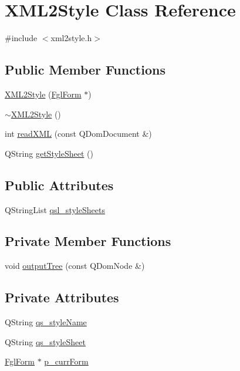 \hypertarget{classXML2Style}{
\section{XML2Style Class Reference}
\label{classXML2Style}
}


{\ttfamily \#include $<$xml2style.h$>$}

\subsection*{Public Member Functions}
\begin{DoxyCompactItemize}
\item 
\hyperlink{classXML2Style_ad4d0925f68a0aeef31a11cfc7c1eb4af}{XML2Style} (\hyperlink{classFglForm}{FglForm} $\ast$)
\item 
\hyperlink{classXML2Style_a671c07757a3f964ef7a0a2be8ca7d45c}{$\sim$XML2Style} ()
\item 
int \hyperlink{classXML2Style_a7092cd6d3d81df9a67f903d9931e3288}{readXML} (const QDomDocument \&)
\item 
QString \hyperlink{classXML2Style_a369089a066a0ea258abb14335f4ca0e0}{getStyleSheet} ()
\end{DoxyCompactItemize}
\subsection*{Public Attributes}
\begin{DoxyCompactItemize}
\item 
QStringList \hyperlink{classXML2Style_aee8ffe7e9130c6966419b3334e03fad4}{qsl\_\-styleSheets}
\end{DoxyCompactItemize}
\subsection*{Private Member Functions}
\begin{DoxyCompactItemize}
\item 
void \hyperlink{classXML2Style_ae6ec6cfd462f7139a47ebf03d1edc5a3}{outputTree} (const QDomNode \&)
\end{DoxyCompactItemize}
\subsection*{Private Attributes}
\begin{DoxyCompactItemize}
\item 
QString \hyperlink{classXML2Style_a8dfd6003a5efc5a49e1126edc93c3535}{qs\_\-styleName}
\item 
QString \hyperlink{classXML2Style_abb76712e28059172c7d98bd7f6923aed}{qs\_\-styleSheet}
\item 
\hyperlink{classFglForm}{FglForm} $\ast$ \hyperlink{classXML2Style_abe26c1d5050c8e78c9f8a770fbab31a1}{p\_\-currForm}
\end{DoxyCompactItemize}



